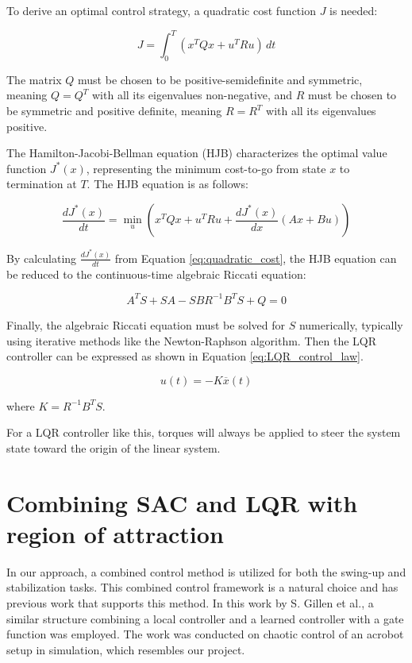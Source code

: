 To derive an optimal control strategy, a quadratic cost function \(J\) is needed:

\begin{equation}
  J = \int_0^{T} \left( x^T Q x + u^T R u \right) \, dt
  \label{eq:quadratic_cost}
\end{equation}

The matrix \( Q \) must be chosen to be positive-semidefinite and symmetric, meaning \( Q = Q^T \) with all its eigenvalues non-negative, and \( R \) must be chosen to be symmetric and positive definite, meaning \( R = R^T \) with all its eigenvalues positive.

The Hamilton-Jacobi-Bellman equation (HJB) characterizes the optimal value function \(J^*(x)\), representing the minimum cost-to-go from state \(x\) to termination at \(T\). The HJB equation is as follows:

\begin{equation}
 \frac{dJ^*(x)}{dt} = \min_u \left( x^T Q x + u^T R u + \frac{dJ^*(x)}{dx} (Ax + Bu) \right)
 \label{eq:HJB}
\end{equation}

By calculating \(\frac{dJ^*(x)}{dt}\) from Equation \ref{eq:quadratic_cost}, the HJB equation can be reduced to the continuous-time algebraic Riccati equation:

\begin{equation}
 A^T S + SA - SBR^{-1}B^T S + Q = 0
\end{equation}

Finally, the algebraic Riccati equation must be solved for \(S\) numerically, typically using iterative methods like the Newton-Raphson algorithm. Then the LQR controller can be expressed as shown in Equation \ref{eq:LQR_control_law}.

\begin{equation}
 u(t) = -K\overline{x}(t)
 \label{eq:LQR_control_law}
\end{equation}

where \(K = R^{-1}B^T S\).

For a LQR controller like this, torques will always be applied to steer the system state toward the origin of the linear system.


\section{Combining SAC and LQR with region of attraction}
In our approach, a combined control method is utilized for both the swing-up and stabilization tasks. This combined control framework is a natural choice and has previous work that supports this method. In this work by S. Gillen et al.\cite{gillen2020combining}, a similar structure combining a local controller and a learned controller with a gate function was employed. The work was conducted on chaotic control of an acrobot setup in simulation, which resembles our project.

